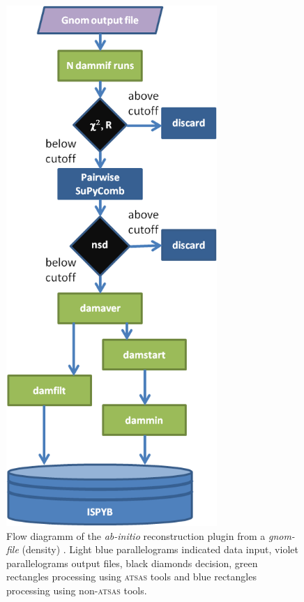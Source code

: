 \documentclass[preprint,pdf]{iucr}              %
\begin{document}
\begin{figure}
\centering
\includegraphics[width=8cm]{model.png}
\caption{Flow diagramm of the \textit{ab-initio} reconstruction plugin from a
\textit{gnom-file} (density) .
Light blue parallelograms indicated data input, violet parallelograms output
files, black diamonds decision, green rectangles processing using \textsc{atsas}
tools and blue rectangles processing using non-\textsc{atsas} tools.}
\label{fgr:modeling}
\end{figure}
\end{document}
